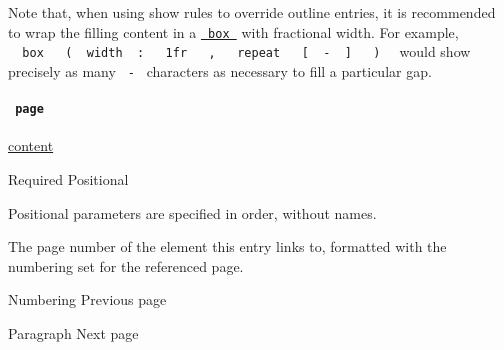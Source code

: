 Note that, when using show rules to override outline entries, it is
recommended to wrap the filling content in a
\href{/docs/reference/layout/box/}{\texttt{\ box\ }} with fractional
width. For example,
\texttt{\ }{\texttt{\ box\ }}\texttt{\ }{\texttt{\ (\ }}\texttt{\ width\ }{\texttt{\ :\ }}\texttt{\ }{\texttt{\ 1fr\ }}\texttt{\ }{\texttt{\ ,\ }}\texttt{\ }{\texttt{\ repeat\ }}\texttt{\ }{\texttt{\ {[}\ }}\texttt{\ -\ }{\texttt{\ {]}\ }}\texttt{\ }{\texttt{\ )\ }}\texttt{\ }
would show precisely as many \texttt{\ -\ } characters as necessary to
fill a particular gap.

\paragraph{\texorpdfstring{\texttt{\ page\ }}{ page }}\label{definitions-entry-page}

\href{/docs/reference/foundations/content/}{content}

{Required} {{ Positional }}

\label{definitions-entry-page-positional-tooltip}
Positional parameters are specified in order, without names.

The page number of the element this entry links to, formatted with the
numbering set for the referenced page.

\href{/docs/reference/model/numbering/}{\pandocbounded{}}

{ Numbering } { Previous page }

\href{/docs/reference/model/par/}{\pandocbounded{}}

{ Paragraph } { Next page }
